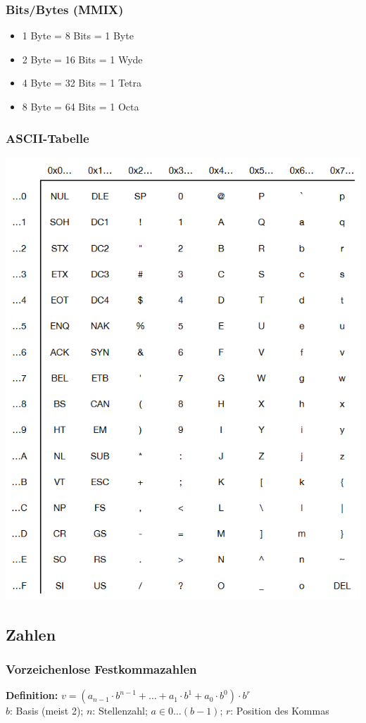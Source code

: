 \documentclass[ngerman, threecolumn, 8pt]{latex4ei/latex4ei_sheet}
\begin{document}
	\subsubsection{Bits/Bytes (MMIX)}
	\begin{itemize}\itemsep0pt
	\item1 Byte = 8 Bits = 1 Byte
	\item2 Byte = 16 Bits = 1 Wyde
	\item4 Byte = 32 Bits = 1 Tetra
	\item8 Byte = 64 Bits = 1 Octa
	\end{itemize}
	\begin{sectionbox}
	\subsubsection{ASCII-Tabelle}
	\includegraphics[width=.85\linewidth]{./img/ascii_table.png}
	\end{sectionbox}
	\subsection{Zahlen}
	\subsubsection{Vorzeichenlose Festkommazahlen}
	\textbf{Definition:} $v=(a_{n-1} \cdot b^{n-1}+\dots+a_1 \cdot b^1 + a_0 \cdot b^0) \cdot b^r$\\
	$b$: Basis (meist 2); $n$: Stellenzahl; $a \in 0 \dots (b-1)$; $r$: Position des Kommas
\end{document}
